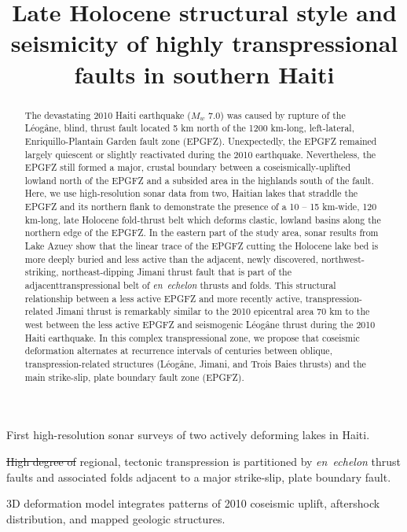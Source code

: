 \documentclass[linenumbers,draft]{agujournal}
\providecommand{\DIFaddtex}[1]{{\protect\color{blue}\uwave{#1}}} %
\providecommand{\DIFdeltex}[1]{{\protect\color{red}\sout{#1}}}                      %
\providecommand{\DIFaddbegin}{} %
\providecommand{\DIFaddend}{} %
\providecommand{\DIFdelbegin}{} %
\providecommand{\DIFdelend}{} %
\providecommand{\DIFadd}[1]{\texorpdfstring{\DIFaddtex{#1}}{#1}} %
\providecommand{\DIFdel}[1]{\texorpdfstring{\DIFdeltex{#1}}{}} %
\begin{document}
\title{Late Holocene structural style and seismicity of highly transpressional faults in southern Haiti}



\begin{keypoints}
\item First high-resolution sonar surveys of two actively deforming lakes in Haiti.
\item \DIFdelbegin \DIFdel{High degree of }\DIFdelend \DIFaddbegin \DIFadd{Extreme }\DIFaddend regional, tectonic transpression is partitioned by \textit{en~echelon} thrust faults and associated folds adjacent to a major strike-slip, plate boundary fault.
\item 3D deformation model integrates patterns of 2010 coseismic uplift, aftershock distribution, and mapped geologic structures.
\end{keypoints}

\begin{abstract}
The devastating 2010 Haiti earthquake ($M_w$ 7.0) was caused by rupture of the L\'eog\^ane, blind, thrust fault located 5 km north of the 1200 km-long, left-lateral, Enriquillo-Plantain Garden fault zone (EPGFZ). Unexpectedly, the EPGFZ remained largely quiescent or slightly reactivated during the 2010 earthquake. Nevertheless, the EPGFZ still formed a major, crustal boundary between a coseismically-uplifted lowland north of the EPGFZ and a subsided area in the highlands south of the fault. Here, we use high-resolution sonar data from two, Haitian lakes that straddle the EPGFZ and its northern flank to demonstrate the presence of a 10 -- 15 km-wide, 120 km-long, late Holocene fold-thrust belt which deforms clastic, lowland basins along the northern edge of the EPGFZ. In the eastern part of the study area, sonar results from Lake Azuey show that the linear trace of the EPGFZ cutting the Holocene lake bed is more deeply buried and less active than the adjacent, newly discovered, northwest-striking, northeast-dipping Jimani thrust fault that is part of the adjacent\DIFaddbegin \DIFadd{, }\DIFaddend transpressional belt of \textit{en~echelon} thrusts and folds. This structural relationship between a less active EPGFZ and more recently active, transpression-related Jimani thrust is remarkably similar to the 2010 epicentral area 70 km to the west between the less active EPGFZ and seismogenic L\'eog\^ane thrust during the 2010 Haiti earthquake. In this complex transpressional zone, we propose that coseismic deformation alternates at recurrence intervals of centuries between oblique, transpression-related structures (L\'eog\^ane, Jimani, and Trois Baies thrusts) and the main strike-slip, plate boundary fault zone (EPGFZ).
\end{abstract}
\end{document}
